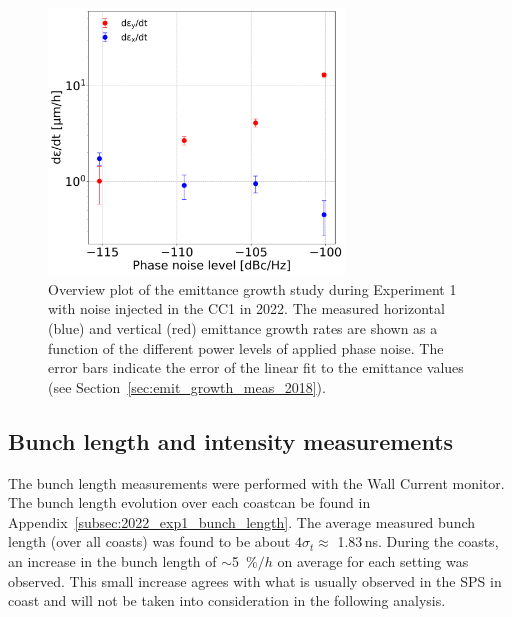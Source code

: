 \begin{figure}[!h] 
     \centering         
   \includegraphics[width=0.7\textwidth]{images/Ch8/emit_H_and_V_noise_scan.png}
       \caption{Overview plot of the emittance growth study during Experiment 1 with noise injected in the CC1 in 2022. The measured horizontal (blue) and vertical (red) emittance growth rates are shown as a function of the different power levels of applied phase noise. The error bars indicate the error of the linear fit to the emittance values (see Section~\ref{sec:emit_growth_meas_2018}).}
       \label{fig:H_V_emit_growth_noise_scan}
\end{figure}

\subsection{Bunch length and intensity measurements}\label{sec:bunch_length_intensity_2022}

The bunch length measurements were performed with the Wall Current monitor. The bunch length evolution over each coastcan be found in Appendix~\ref{subsec:2022_exp1_bunch_length}. The average measured bunch length (over all coasts) was found to be about $4\sigma_t \approx $ 1.83\,ns. During the coasts, an increase in the bunch length of $\sim$5~$\%/h$ on average for each setting was observed. This small increase agrees with what is usually observed in the SPS in coast and will not be taken into consideration in the following analysis. 



